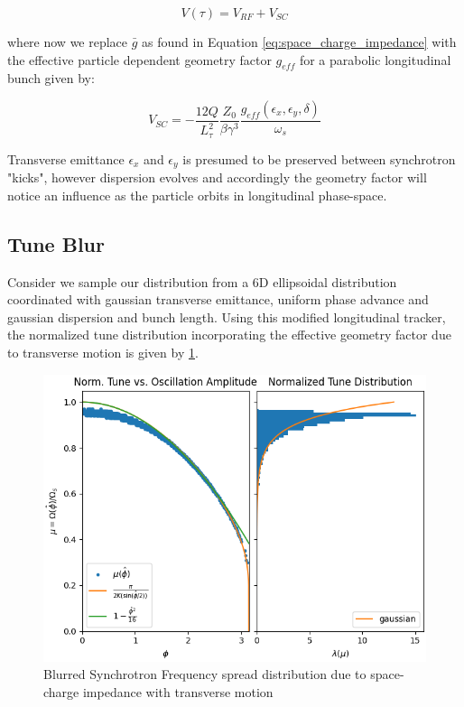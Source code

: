 $$V(\tau) = V_{RF} + V_{SC}$$

where now we replace $\bar{g}$ as found in Equation \ref{eq:space_charge_impedance} with the effective particle dependent geometry factor $g_{eff}$ for a parabolic longitudinal bunch given by:

$$V_{SC} = -\frac{12Q}{L_\tau^2}\frac{Z_0}{\beta\gamma^3}\frac{g_{eff}(\epsilon_x,\epsilon_y,\delta)}{\omega_s}$$

Transverse emittance $\epsilon_x$ and $\epsilon_y$ is presumed to be preserved between synchrotron "kicks", however dispersion evolves and accordingly the geometry factor will notice an influence as the particle orbits in longitudinal phase-space.

\subsection{Tune Blur}

Consider we sample our distribution from a 6D ellipsoidal distribution coordinated with gaussian transverse emittance, uniform phase advance and gaussian dispersion and bunch length. Using this modified longitudinal tracker, the normalized tune distribution incorporating the effective geometry factor due to transverse motion is given by \ref{fig:tune_blurr}.

\begin{figure}
    \centering
    \includegraphics{figs/tune_blurr/blurred_tune.png}
    \caption{Blurred Synchrotron Frequency spread distribution due to space-charge impedance with transverse motion}
    \label{fig:tune_blurr}
\end{figure}


